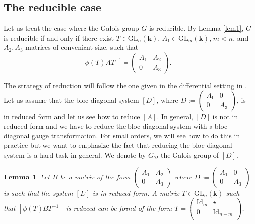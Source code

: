 \documentclass[a4paper,11pt]{amsart}
\newcommand{\GL}{\operatorname{GL}}
\newcommand{\Gdiag}{G_{\mathcal{D}}}
\newtheorem{lem}[thm]{Lemma}
\def\k{\mathbf{k}}
\def\GL{\mathrm{GL}}
\begin{document}
\subsection{The reducible case}
\label{sec:reducible case}

Let us treat the case where the Galois group $G$ is reducible.  By Lemma  \ref{lem1},  $G$ is reducible if and only if there exist $T\in \mathrm{GL}_n(\k)$,  $A_1\in \mathrm{GL}_m(\k)$, $m<n$,  and $A_2,A_3$ matrices of convenient size,    such that 
$$\phi(T)AT^{-1}=\left(\begin{array}{cc}
A_1 &  A_2\\
0 & A_3  
\end{array}\right).
$$

The strategy of reduction will follow the one given in the differential setting in \cite[Section 5]{dreyfus2019computing}.   Let us assume that the bloc diagonal system $[D]$, where $D:=\begin{pmatrix}
A_1&0 \\ 
0 &A_3 
\end{pmatrix}$, is in reduced form and let us see how to reduce $[A]$.  In general, $[D]$ is not in reduced form and we have to reduce the bloc diagonal system with a bloc diagonal gauge transformation. 
For small orders, we will see how to do this in practice but we want to emphasize the fact that reducing the bloc diagonal system is a hard task in general.   We denote by $\Gdiag$ the Galois group of $[D]$.



\begin{lem}
 \label{lem:Gauge transfo reduc}
 Let $B$ be a matrix of the form $\begin{pmatrix}
 A_1 & A_2 \\ 0 & A_3
 \end{pmatrix}$ where $D:= \begin{pmatrix}
 A_1 & 0 \\ 0 & A_3
 \end{pmatrix}$ is such that the system $[D]$ is in reduced form. 
A matrix $T\in \GL_n(\k)$ such that $\left[\phi(T)BT^{-1}\right]$ is reduced can be found of the form $T=\begin{pmatrix}
\mathrm{Id}_m & \star \\ 
0 & \mathrm{Id}_{n-m}\\
\end{pmatrix}$. 
\end{lem}
\end{document}
